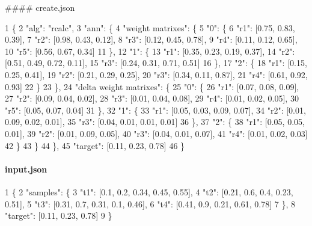 \#\#\#\# create.\+json 
\begin{DoxyCode}
1 \{
2     "alg": "rcalc",
3     "ann": \{
4         "weight matrixes": \{
5             "0": \{
6                 "r1": [0.75, 0.83, 0.39],
7                 "r2": [0.98, 0.43, 0.12],
8                 "r3": [0.12, 0.45, 0.78],
9                 "r4": [0.11, 0.12, 0.65],
10                 "r5": [0.56, 0.67, 0.34]
11             \},
12             "1": \{
13                 "r1": [0.35, 0.23, 0.19, 0.37],
14                 "r2": [0.51, 0.49, 0.72, 0.11],
15                 "r3": [0.24, 0.31, 0.71, 0.51]
16             \},
17             "2": \{
18                 "r1": [0.15, 0.25, 0.41],
19                 "r2": [0.21, 0.29, 0.25],
20                 "r3": [0.34, 0.11, 0.87],
21                 "r4": [0.61, 0.92, 0.93]
22             \}
23         \},
24         "delta weight matrixes": \{
25             "0": \{
26                 "r1": [0.07, 0.08, 0.09],
27                 "r2": [0.09, 0.04, 0.02],
28                 "r3": [0.01, 0.04, 0.08],
29                 "r4": [0.01, 0.02, 0.05],
30                 "r5": [0.05, 0.07, 0.04]
31             \},
32             "1": \{
33                 "r1": [0.05, 0.03, 0.09, 0.07],
34                 "r2": [0.01, 0.09, 0.02, 0.01],
35                 "r3": [0.04, 0.01, 0.01, 0.01]
36             \},
37             "2": \{
38                 "r1": [0.05, 0.05, 0.01],
39                 "r2": [0.01, 0.09, 0.05],
40                 "r3": [0.04, 0.01, 0.07],
41                 "r4": [0.01, 0.02, 0.03]
42             \}
43         \}
44     \},
45     "target": [0.11, 0.23, 0.78]
46 \}
\end{DoxyCode}
 \paragraph*{input.\+json}


\begin{DoxyCode}
1 \{
2     "samples": \{
3         "t1": [0.1, 0.2, 0.34, 0.45, 0.55],
4         "t2": [0.21, 0.6, 0.4, 0.23, 0.51],
5         "t3": [0.31, 0.7, 0.31, 0.1, 0.46],
6         "t4": [0.41, 0.9, 0.21, 0.61, 0.78]
7     \},
8     "target": [0.11, 0.23, 0.78]
9 \}
\end{DoxyCode}
 
